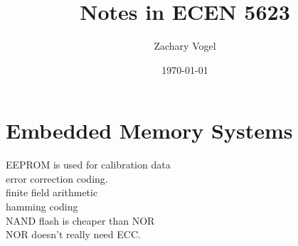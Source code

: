 \documentclass{article}
\author{Zachary Vogel}
\date{\today}
\title{Notes in ECEN 5623}
\begin{document}
\maketitle


\section*{Embedded Memory Systems}
EEPROM is used for calibration data\\

error correction coding.\\

finite field arithmetic\\

hamming coding\\

NAND flash is cheaper than NOR\\
NOR doesn't really need ECC.\\
\end{document}
